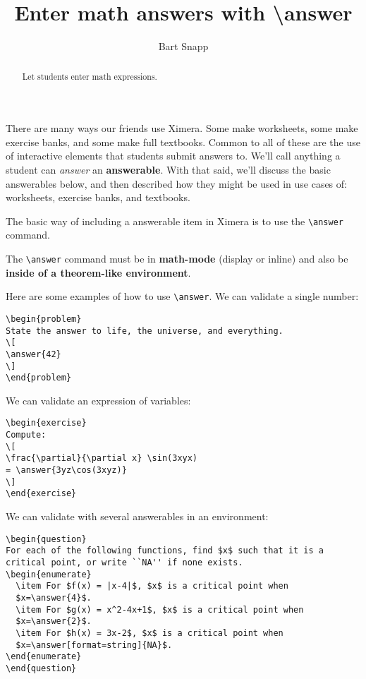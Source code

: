 \documentclass{ximera}
\title{Enter math answers with \textbackslash answer}
\author{Bart Snapp}
\begin{document}
\begin{abstract}
  Let students enter math expressions.
\end{abstract}
\maketitle


There are many ways our friends use Ximera. Some make worksheets, some make
exercise banks, and some make full textbooks. Common to all of these are the
use of interactive elements that students submit answers to. We'll call
anything a student can \textit{answer} an \textbf{answerable}.
With that said, we'll discuss the basic answerables below, and then described
how they might be used in use cases of: worksheets, exercise banks, and
textbooks.


The basic way of including a answerable item in Ximera is to use the
\verb|\answer| command.

\begin{warning}
  The \verb|\answer| command must be in \textbf{math-mode} (display or inline)
  and also be \textbf{inside of a
    theorem-like environment}.
\end{warning}
Here are some examples of how to use \verb!\answer!. We can validate a single
number:
\begin{verbatim}
\begin{problem}
State the answer to life, the universe, and everything.
\[
\answer{42}
\]
\end{problem}
\end{verbatim}
We can validate an expression of variables:
\begin{verbatim}
\begin{exercise}
Compute:
\[
\frac{\partial}{\partial x} \sin(3xyx) 
= \answer{3yz\cos(3xyz)}
\]
\end{exercise}
\end{verbatim}
We can validate with several answerables in an environment:
\begin{verbatim}
\begin{question}
For each of the following functions, find $x$ such that it is a
critical point, or write ``NA'' if none exists.
\begin{enumerate}
  \item For $f(x) = |x-4|$, $x$ is a critical point when 
  $x=\answer{4}$.
  \item For $g(x) = x^2-4x+1$, $x$ is a critical point when 
  $x=\answer{2}$.
  \item For $h(x) = 3x-2$, $x$ is a critical point when 
  $x=\answer[format=string]{NA}$.
\end{enumerate}
\end{question}
\end{verbatim}
\end{document}
